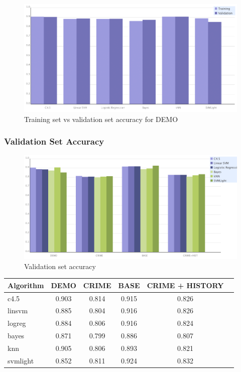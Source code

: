 \documentclass[11pt,letter]{article}
\begin{document}
\begin{figure}
	\centering
	\includegraphics[scale=0.4]{report_figures/tv_accuracy_bar.png}
	\caption{Training set vs validation set accuracy for DEMO}
\end{figure}

\subsubsection{Validation Set Accuracy}

\begin{figure}
	\centering
	\includegraphics[scale=0.4]{report_figures/val_accuracy_bar.png}
	\caption{Validation set accuracy}
\end{figure}

\begin{tabular}{|l|c|c|c|c|c|}
\hline
Algorithm & DEMO & CRIME & BASE & CRIME + HISTORY\\
\hline
c4.5     & 0.903 & 0.814 & 0.915 & 0.826 \\
linsvm   & 0.885 & 0.804 & 0.916 & 0.826 \\
logreg   & 0.884 & 0.806 & 0.916 & 0.824 \\
bayes    & 0.871 & 0.799 & 0.886 & 0.807 \\
knn   & 0.905 & 0.806 & 0.893 & 0.821 \\
svmlight & 0.852 & 0.811 & 0.924 & 0.832 \\
\hline
\end{tabular}
\end{document}
